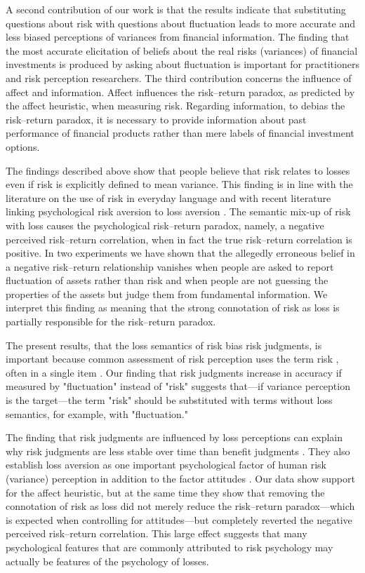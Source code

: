 \documentclass[a4paper,man, natbib,floatsintext]{apa6} %
\begin{document}
{A second contribution of our work is that the results indicate that substituting questions about risk with questions about fluctuation leads to more accurate and less biased perceptions of variances from financial information. The finding that the most accurate elicitation of beliefs about the real risks (variances) of financial investments is produced by asking about fluctuation is important for practitioners and risk perception researchers. The third contribution concerns the influence of affect and information. Affect influences the risk--return paradox, as predicted by the affect heuristic, when measuring risk. Regarding information, to debias the risk--return paradox, it is necessary to provide information about past performance of financial products rather than mere labels of financial investment options.

The findings described above show that people believe that risk relates to losses even if risk is explicitly defined to mean variance. This finding is in line with the literature on the use of risk in everyday language \citep{Boholm2016} and with recent literature linking psychological risk aversion to loss aversion \citep{Duxbury2004}. The semantic mix-up of risk with loss causes the psychological risk--return paradox, namely, a negative perceived risk--return correlation, when in fact the true risk--return correlation is positive. In two experiments we have shown that the allegedly erroneous belief in a negative risk--return relationship vanishes when people are asked to report fluctuation of assets rather than risk and when people are not guessing the properties of the assets but judge them from fundamental information. We interpret this finding as meaning that the strong connotation of risk as loss is partially responsible for the risk--return paradox. 

The present results, that the loss semantics of risk bias risk judgments, is important because common assessment of risk perception uses the term risk \citep[e.g.,][]{Socio-EconomicPanelSOEP2012}, often in a single item \citep[e.g.,][]{Keller2006}. Our finding that risk judgments increase in accuracy if measured by "fluctuation" instead of "risk" suggests that---if variance perception is the target---the term "risk" should be substituted with terms without loss semantics, for example, with "fluctuation."

The finding that risk judgments are influenced by loss perceptions can explain why risk judgments are less stable over time than benefit judgments \citep{Connor2016}. They also establish loss aversion as one important psychological factor of human risk (variance) perception in addition to the factor attitudes \citep{Finucane2000, Slovic2007}. Our data show support for the affect heuristic, but at the same time they show that removing the connotation of risk as loss did not merely reduce the risk--return paradox---which is expected when controlling for attitudes---but completely reverted the negative perceived risk--return correlation. This large effect suggests that many psychological features that are commonly attributed to risk psychology may actually be features of the psychology of losses.

}
\end{document}
